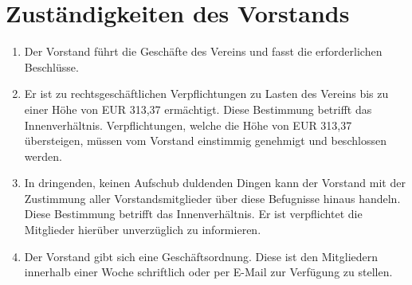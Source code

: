 \documentclass[a4paper,ngerman]{scrartcl}
\begin{document}
\section{Zuständigkeiten des Vorstands}
\begin{enumerate}
\item Der Vorstand führt die Geschäfte des Vereins und fasst die erforderlichen Beschlüsse.
\item Er ist zu rechtsgeschäftlichen Verpflichtungen zu Lasten des Vereins bis zu einer Höhe von EUR 313,37 ermächtigt. Diese Bestimmung betrifft das Innenverhältnis. Verpflichtungen, welche die Höhe von EUR 313,37 übersteigen, müssen vom Vorstand einstimmig genehmigt und beschlossen werden.
\item In dringenden, keinen Aufschub duldenden Dingen kann der Vorstand mit der Zustimmung aller Vorstandsmitglieder über diese Befugnisse hinaus handeln. Diese Bestimmung betrifft das Innenverhältnis. Er ist verpflichtet die Mitglieder hierüber unverzüglich zu informieren.
\item Der Vorstand gibt sich eine Geschäftsordnung. Diese ist den Mitgliedern innerhalb einer Woche schriftlich oder per E-Mail zur Verfügung zu stellen.
\end{enumerate}
\end{document}
